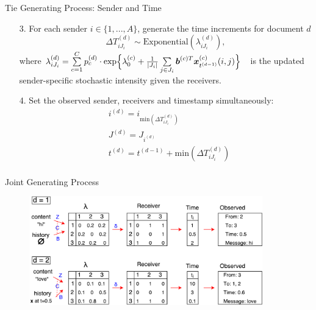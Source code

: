 \documentclass[10pt, xcolor=table]{beamer}
\theoremstyle{definition}
\theoremstyle{remark}
\begin{document}
\begin{frame}{Tie Generating Process: Sender and Time}
\begin{itemize}
		\item [3.] For each sender $i \in \{1,...,A\}$, generate the time increments for document $d$
		\begin{equation*}
		\Delta T^{(d)}_{i{J_i}} \sim \mbox{Exponential}(\lambda_{i{J_i}}^{(d)}),
		\end{equation*}\normalsize
		where \footnotesize$\lambda^{(d)}_{iJ_i}= \sum\limits_{c=1}^{C} p^{(d)}_c\cdot\mbox{exp}\Big\{\lambda^{(c)}_0+\textcolor{black}{\frac{1}{|J_i|}\sum\limits_{j \in J_i} \boldsymbol{b}^{(c)T}\boldsymbol{x}^{(c)}_{t^{(d-1)}}(i, j)}\Big\}\quad$\normalsize is the updated sender-specific stochastic intensity given the receivers.\vspace{0.4cm}
		\item[4.] Set the observed sender, receivers and timestamp simultaneously:
			\begin{equation*}
		\begin{aligned}
		&i^{(d)} = i_{\mbox{min}(\Delta T^{(d)}_{i{J_i}})} \\
		&J^{(d)} = J_{i^{(d)}}\\
		&t^{(d)} = t^{(d-1)}+\mbox{min}(\Delta T^{(d)}_{i{J_i}})\\
		\end{aligned}
		\end{equation*}
		\normalsize
\end{itemize}
\end{frame}

\begin{frame}{Joint Generating Process}

	\begin{figure}
		\includegraphics[width=0.9\textwidth]{figures/summary.pdf}
	\end{figure}	\vspace{0.1cm}

\end{frame}
\end{document}
